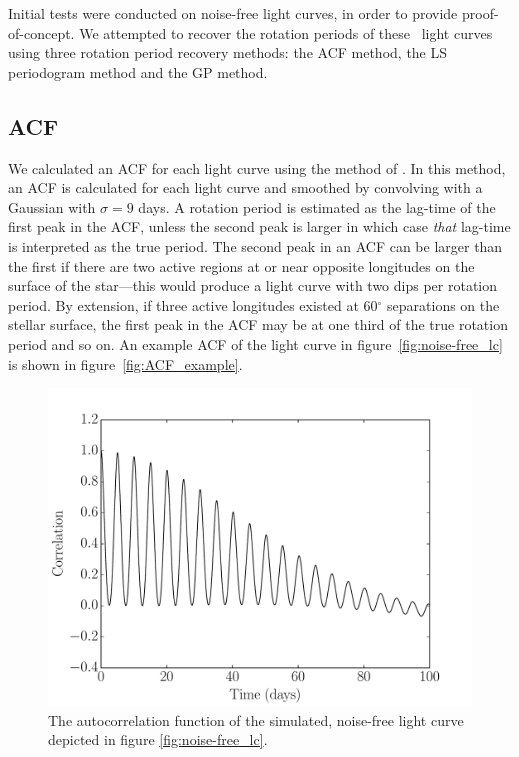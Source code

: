 Initial tests were conducted on noise-free light curves, in order to provide
proof-of-concept.
We attempted to recover the rotation periods of these \nlightcurves\ light
curves
using three rotation period recovery methods: the ACF method, the LS
periodogram method and the GP method.

\subsection{ACF}

We calculated an ACF for each light curve using the method of
\citet{Mcquillan2013}.
In this method, an ACF is calculated for each light curve and smoothed by
convolving with a Gaussian with $\sigma=9$ days.
A rotation period is estimated as the lag-time of the first peak in the ACF,
unless the second peak is larger in which case {\it that} lag-time is
interpreted as the true period.
The second peak in an ACF can be larger than the first if there are two active
regions at or near opposite longitudes on the surface of the star---this would
produce a light curve with two dips per rotation period.
By extension, if three active longitudes existed at 60$^\circ$ separations on
the stellar surface, the first peak in the ACF may be at one third of the true
rotation period and so on.
An example ACF of the light curve in figure~\ref{fig:noise-free_lc} is shown
in figure~\ref{fig:ACF_example}.

\begin{figure}
\begin{center}
\includegraphics[width=6in, clip=true]{figures/noise-free_acf.pdf}
\caption[An ACF of a simulated light curve.]
{The autocorrelation function of the simulated, noise-free light
curve depicted in figure \ref{fig:noise-free_lc}.}
\end{center}
\end{figure}
\label{fig:ACF_example}

